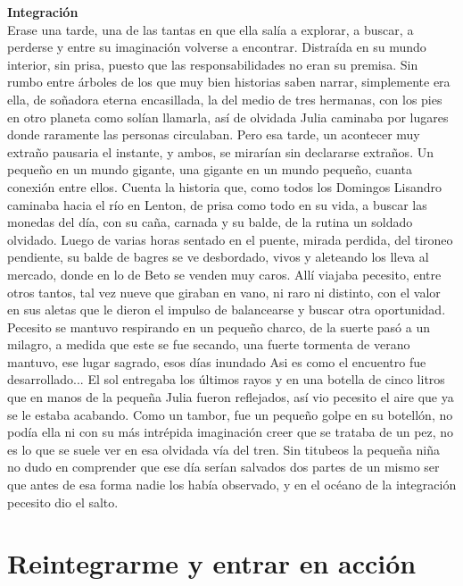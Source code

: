 \documentclass[12pt, a4paper, twoside]{book} %
\begin{document}
\noindent\textbf{Integración}\\
Erase una tarde, una de las tantas en que ella salía a explorar, a buscar, a perderse y entre su imaginación volverse a encontrar. Distraída en su mundo interior, sin prisa, puesto que las responsabilidades no eran su premisa. Sin rumbo entre árboles de los que muy bien  historias saben narrar, simplemente era ella, de soñadora eterna encasillada,  la del medio de tres hermanas, con los pies en otro planeta como solían llamarla, así de olvidada Julia caminaba por lugares donde raramente las personas circulaban.
Pero esa tarde, un acontecer muy extraño  pausaria el instante, y ambos, se mirarían sin declararse extraños.
Un pequeño en un mundo gigante, una gigante en un mundo pequeño, cuanta conexión entre ellos.
Cuenta la historia que, como todos los Domingos Lisandro caminaba hacia el río en Lenton, de prisa como todo en su vida, a buscar las monedas del día, con su caña, carnada y su balde, de la rutina un soldado olvidado.
Luego de varias horas sentado en el puente, mirada perdida, del tironeo pendiente, su balde de bagres se ve desbordado, vivos y aleteando los lleva al mercado, donde en lo de Beto se venden muy caros.
Allí viajaba pecesito, entre otros tantos, tal vez nueve que giraban en vano, ni raro ni distinto, con el valor en sus aletas que le dieron el impulso de balancearse y buscar otra oportunidad.
Pecesito se mantuvo respirando en un pequeño charco, de la suerte pasó a un milagro, a medida que este se fue secando, una fuerte tormenta de verano mantuvo, ese lugar sagrado, esos días inundado
Asi es como el encuentro fue desarrollado...
El sol entregaba los últimos rayos y en una botella de cinco litros que  en manos de la pequeña Julia  fueron reflejados, así vio pecesito el aire que ya se le estaba acabando.
Como un tambor, fue un pequeño golpe en su botellón, no podía ella ni  con su más intrépida imaginación creer que se trataba de un pez, no es lo que se suele ver en esa olvidada vía del tren.
Sin titubeos la pequeña niña no dudo en comprender que ese día serían salvados dos partes de un mismo ser que antes de esa forma nadie los había observado, y en el océano de la integración pecesito dio el salto.


\chapter{Reintegrarme y entrar en acción}
\end{document}
